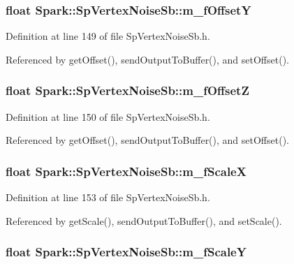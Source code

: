 \subsubsection{\setlength{\rightskip}{0pt plus 5cm}float {\bf Spark::Sp\-Vertex\-Noise\-Sb::m\_\-f\-Offset\-Y}\hspace{0.3cm}{\tt  [protected]}}\label{classSpark_1_1SpVertexNoiseSb_p9}


Definition at line 149 of file Sp\-Vertex\-Noise\-Sb.h.

Referenced by get\-Offset(), send\-Output\-To\-Buffer(), and set\-Offset().
\subsubsection{\setlength{\rightskip}{0pt plus 5cm}float {\bf Spark::Sp\-Vertex\-Noise\-Sb::m\_\-f\-Offset\-Z}\hspace{0.3cm}{\tt  [protected]}}\label{classSpark_1_1SpVertexNoiseSb_p10}


Definition at line 150 of file Sp\-Vertex\-Noise\-Sb.h.

Referenced by get\-Offset(), send\-Output\-To\-Buffer(), and set\-Offset().
\subsubsection{\setlength{\rightskip}{0pt plus 5cm}float {\bf Spark::Sp\-Vertex\-Noise\-Sb::m\_\-f\-Scale\-X}\hspace{0.3cm}{\tt  [protected]}}\label{classSpark_1_1SpVertexNoiseSb_p11}


Definition at line 153 of file Sp\-Vertex\-Noise\-Sb.h.

Referenced by get\-Scale(), send\-Output\-To\-Buffer(), and set\-Scale().
\subsubsection{\setlength{\rightskip}{0pt plus 5cm}float {\bf Spark::Sp\-Vertex\-Noise\-Sb::m\_\-f\-Scale\-Y}\hspace{0.3cm}{\tt  [protected]}}\label{classSpark_1_1SpVertexNoiseSb_p12}


